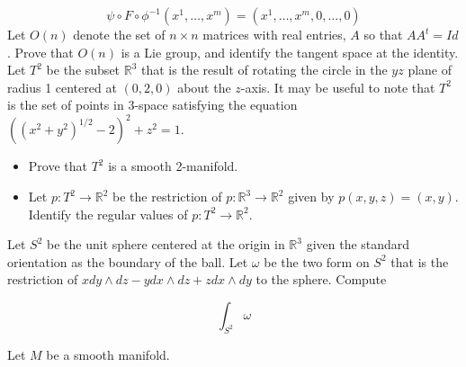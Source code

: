 \documentclass[10pt]{article}
\begin{document}
$$
\psi \circ F \circ \phi^{-1}\left(x^{1}, \ldots, x^{m}\right)=\left(x^{1}, \ldots, x^{m}, 0, \ldots, 0\right)
$$
\newpage
 Let $O(n)$ denote the set of $n \times n$ matrices with real entries, $A$ so that $A A^{t}=I d$. Prove that $O(n)$ is a Lie group, and identify the tangent space at the identity.
\newpage
 Let $T^{2}$ be the subset $\mathbb{R}^{3}$ that is the result of rotating the circle in the $y z$ plane of radius 1 centered at $(0,2,0)$ about the $z$-axis. It may be useful to note that $T^{2}$ is the set of points in 3-space satisfying the equation $\left(\left(x^{2}+y^{2}\right)^{1 / 2}-2\right)^{2}+z^{2}=1 .$
\begin{itemize}
  \item Prove that $T^{2}$ is a smooth 2-manifold.

  \item Let $p: T^{2} \rightarrow \mathbb{R}^{2}$ be the restriction of $p: \mathbb{R}^{3} \rightarrow \mathbb{R}^{2}$ given by $p(x, y, z)=(x, y)$. Identify the regular values of $p: T^{2} \rightarrow \mathbb{R}^{2}$.

\end{itemize}
\newpage
 Let $S^{2}$ be the unit sphere centered at the origin in $\mathbb{R}^{3}$ given the standard orientation as the boundary of the ball. Let $\omega$ be the two form on $S^{2}$ that is the restriction of $x d y \wedge d z-y d x \wedge d z+z d x \wedge d y$ to the sphere. Compute

$$
\int_{S^{2}} \omega
$$

\newpage
Let $M$ be a smooth manifold.
\end{document}
